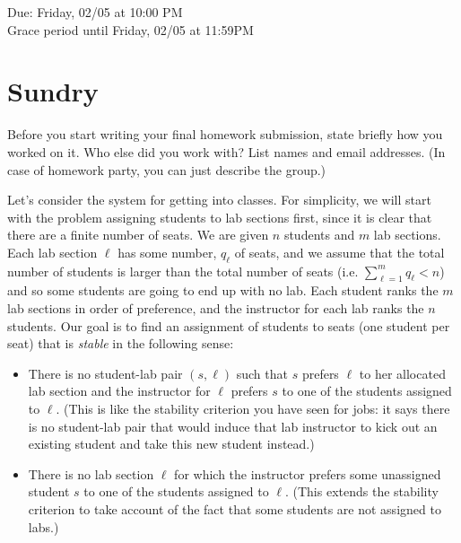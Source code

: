 \documentclass[11pt]{article}
\begin{document}
\maketitle
\fontsize{12}{15}\selectfont

\begin{center}
    Due: Friday, 02/05  at 10:00 PM \\
    Grace period until Friday, 02/05 at 11:59PM
\end{center}

\section*{Sundry}

Before you start writing your final homework submission, state briefly how you worked on it. Who else did you work with? List names and email addresses. (In case of homework party, you can just describe the group.)

Let's consider the system for getting into classes. For simplicity, we
will start with the problem assigning students to lab sections first,
since it is clear that there are a finite number of seats. We are given $n$
students and $m$ lab sections. 
Each lab section $\ell$ has some number, $q_\ell$ of seats, 
and we assume that the total number of students is larger than the total number of seats
(i.e. $\sum_{\ell=1}^m{q_{\ell}} < n$) and so some students are going to end
up with no lab. 
Each student ranks the $m$ lab sections in order of preference, and
the instructor for each lab ranks the $n$ students. 
Our goal is to find an assignment of students to seats (one student per seat) that is \textit{stable} 
in the following sense:
\begin{itemize}
\item There is no student-lab pair $(s,\ell)$ such that $s$ prefers $\ell$ to her allocated lab section
and the instructor for $\ell$ prefers $s$ to one of the students assigned to $\ell$. 
(This is like the stability criterion you have seen for jobs: 
it says there is no student-lab pair that would induce that lab instructor
to kick out an existing student and take this new student instead.)
\item There is no lab section $\ell$ for which the instructor prefers some unassigned student $s$ to one of the students assigned to $\ell$.
(This extends the stability criterion to take account of the fact that 
some students are not assigned to labs.)
\end{itemize}
\end{document}
